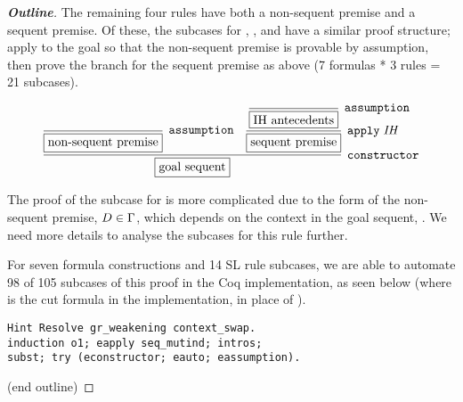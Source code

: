 \begin{proof}[\textbf{Outline}]
The remaining four rules have both a non-sequent premise and a sequent premise. Of these, the subcases for \rlnmsbc{}, \rlnmssome{}, and \rlnmball{} have a similar proof structure; apply  to the goal so that the non-sequent premise is provable by assumption, then prove the branch for the sequent premise as above (7 formulas * 3 rules = 21 subcases).


{\small
$$
\infer[\coqtm{constructor}]{\fbox{goal sequent}}{
	\infer[\coqtm{assumption}]{\fbox{non-sequent premise}}{}
	&
	\infer[\coqtm{apply} \; \mathit{IH}]{\fbox{sequent premise}}{
	    \infer[\coqtm{assumption}]{\fbox{IH antecedents}}{}
	}
}
$$
}

The proof of the subcase for \rlnmsinit{} is more complicated due to the form of the non-sequent premise, $D \in \Gamma{}$, which depends on the context in the goal sequent, . We need more details to analyse the subcases for this rule further.

For seven formula constructions and 14 SL rule subcases, we are able to automate 98 of 105 subcases of this proof in the Coq implementation, as seen below (where  is the cut formula in the implementation, in place of \delta).

\begin{lstlisting}
Hint Resolve gr_weakening context_swap.
induction o1; eapply seq_mutind; intros;
subst; try (econstructor; eauto; eassumption).
\end{lstlisting}

\hfill (end outline)
\end{proof}


